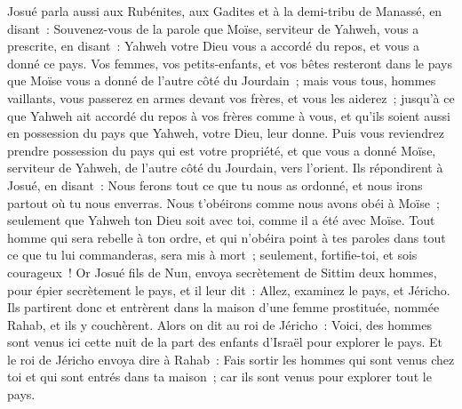 \begin{multicols}{2}
Josué parla aussi aux Rubénites, aux Gadites et à la demi-tribu de Manassé, en disant~:
Souvenez-vous de la parole que Moïse, serviteur de Yahweh, vous a prescrite, en disant~: Yahweh votre Dieu vous a accordé du repos, et vous a donné ce pays.
Vos femmes, vos petits-enfants, et vos bêtes resteront dans le pays que Moïse vous a donné de l'autre côté du Jourdain~; mais vous tous, hommes vaillants, vous passerez en armes devant vos frères, et vous les aiderez~;
jusqu'à ce que Yahweh ait accordé du repos à vos frères comme à vous, et qu'ils soient aussi en possession du pays que Yahweh, votre Dieu, leur donne. Puis vous reviendrez prendre possession du pays qui est votre propriété, et que vous a donné Moïse, serviteur de Yahweh, de l'autre côté du Jourdain, vers l'orient.
Ils répondirent à Josué, en disant~: Nous ferons tout ce que tu nous as ordonné, et nous irons partout où tu nous enverras.
Nous t'obéirons comme nous avons obéi à Moïse~; seulement que Yahweh ton Dieu soit avec toi, comme il a été avec Moïse.
Tout homme qui sera rebelle à ton ordre, et qui n'obéira point à tes paroles dans tout ce que tu lui commanderas, sera mis à mort~; seulement, fortifie-toi, et sois courageux~!
\VerseOne{}Or Josué fils de Nun, envoya secrètement de Sittim deux hommes, pour épier secrètement le pays, et il leur dit~: Allez, examinez le pays, et Jéricho. Ils partirent donc et entrèrent dans la maison d'une femme prostituée, nommée Rahab, et ils y couchèrent.
Alors on dit au roi de Jéricho~: Voici, des hommes sont venus ici cette nuit de la part des enfants d'Israël pour explorer le pays.
Et le roi de Jéricho envoya dire à Rahab~: Fais sortir les hommes qui sont venus chez toi et qui sont entrés dans ta maison~; car ils sont venus pour explorer tout le pays.

\end{multicols}
